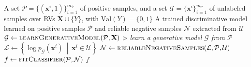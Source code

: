 \documentclass{article}
\begin{document}
\begin{algorithm}[!h]
\renewcommand{\algorithmicrequire}{\textbf{Input:}}
\renewcommand{\algorithmicensure}{\textbf{Output:}}
	\caption{GPU learning: \textsc{LearnGPU}$(\mathcal{P},\mathcal{U})$}
	\begin{algorithmic}[1]
	    \REQUIRE
	    A set $\mathcal{P}=\{(\mathbf{x}^{i},1)\}_{i=1}^{m_{\mathcal{P}}}$ of positive samples,
	    and a set $\mathcal{U}=\{\mathbf{x}^{i}\}_{i=1}^{m_{\mathcal{U}}}$ of unlabeled samples
	    over RVs $\mathbf{X}\cup\{Y\}$, with $\mathrm{Val}(Y)=\{0,1\}$
	    \ENSURE
	    A trained discriminative model learned on positive samples $\mathcal{P}$ and reliable
	    negative samples $\mathcal{N}$ extracted from $\mathcal{U}$
	    \STATE $\mathcal{G}\leftarrow \textsc{learnGenerativeModel}(\mathcal{P},\mathbf{X})$
	    \hfill $\triangleright$ \emph{learn a generative model $\mathcal{G}$ from $\mathcal{P}$} %
	    \STATE $\mathcal{L}\leftarrow \left\{\log p_{\mathcal{G}}(\mathbf{x}^{i})\ \middle|\ \mathbf{x}^{i}\in\mathcal{U}\right\}$ %
	    \STATE $\mathcal{N}\leftarrow \textsc{reliableNegativeSamples}(\mathcal{L},\mathcal{P},\mathcal{U})$ %
	    \STATE $f\leftarrow \textsc{fitClassifier}(\mathcal{P},\mathcal{N})$
		\RETURN $f$
	\end{algorithmic}
\end{algorithm}
\end{document}
